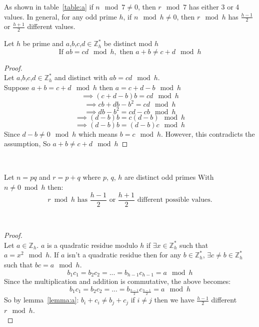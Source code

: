 \documentclass{article}
\begin{document}
{\begin{table}[H]
\end{table}
As shown in table~\ref{table:a} if $n \mod 7 \neq 0$, then $r \mod 7$ has either 3 or 4 values. In general, for any odd prime $h$, if $n \mod h \neq 0$, then $r \mod h$ has $\frac{h-1}{2}$ or $\frac{h+1}{2}$ different values.\\
\begin{lemma}\label{lemma:a}
Let $h$ be prime and $a$,$b$,$c$,$d \in \mathbb{Z}_h^*$ be distinct mod $h$
\begin{equation*}
\text{If } ab = cd \mod h, \text{ then } a+b \neq c+d \mod h
\end{equation*}
\end{lemma}
\begin{proof}
~\\
Let $a$,$b$,$c$,$d \in \mathbb{Z}_h^*$ and distinct with $ab = cd \mod h$.\\
Suppose $a+b = c+d \mod h$ 
then $a = c+d - b \mod h $
$$\implies (c+d -b)b = cd \mod h $$
$$\implies cb + db -b^2 = cd \mod h $$
$$\implies db - b ^2 = cd -cb \mod h$$
$$\implies (d-b)b = c(d-b) \mod h$$
$$\implies (d-b)b = (d-b)c \mod h$$
Since $d-b \neq 0 \mod h$ which means $b= c \mod h$. 
However, this contradicts the assumption, So $a+b \neq c+d \mod h$
\end{proof}
\
\begin{proposition}\label{prop:b}
Let $n = pq$ and $r = p+q$ where $p$, $q$, $h$ are distinct odd primes With $n \neq 0 \bmod h$ then:
\begin{equation*}
r \bmod h \text{ has } \frac{h-1}{2} \text{ or } \frac{h+1}{2} \text{ different possible values.}
\end{equation*}
\end{proposition}
\
\begin{proof}
~\\
Let $ a \in \mathbb{Z}_h$. $a$ is a quadratic residue modulo $h$ if $\exists x \in \mathbb{Z}_h^*$ such that $a = x^2 \mod h$. If $a$ isn't a quadratic residue then for any $b \in \mathbb{Z}_h^*$, $\exists c \neq b \in \mathbb{Z}_h^*$ such that $bc = a \mod h$.
$$b_1 c_1 = b_2 c_2 = ... = b_{h-1} c_{h-1} = a \mod h$$
Since the multiplication and addition is commutative, the above becomes:
$$b_1 c_1 = b_2 c_2 = ... = b_{\frac{h-1}{2}} c_{\frac{h-1}{2}} = a \mod h$$
So by lemma~\ref{lemma:a}: $b_i + c_i \neq b_j + c_j$ if $i \neq j$ then we have $\frac{h-1}{2}$ different $r \mod h$.\\

\end{proof}}
\end{document}
